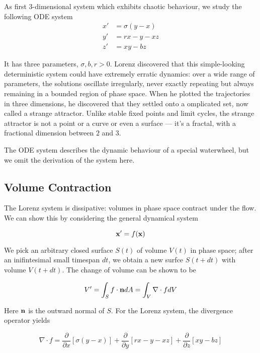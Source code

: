 
As first 3-dimensional system which exhibits chaotic behaviour, we study the following ODE system
\begin{align*}
    x' &= \sigma(y-x) \\
    y' &= rx - y - xz \\
    z' &= xy - bz
\end{align*}

It has three parameters, $\sigma, b, r > 0$. Lorenz discovered that this simple-looking deterministic system could have extremely erratic dynamics: over a wide range of parameters, the solutions oscillate irregularly, never exactly repeating but always remaining in a bounded region of phase space. When he plotted the trajectories in three dimensions, he discovered that they settled onto a  omplicated set, now called a strange attractor. Unlike stable fixed points and limit cycles, the strange attractor is not a point or a  curve or even a surface — it’s a fractal, with a fractional dimension between $2$ and $3$.

The ODE system describes the dynamic behaviour of a special waterwheel, but we omit the derivation of the system here. 

\subsection{Volume Contraction}

The Lorenz system is dissipative: volumes in phase space contract under the flow. We can show this by considering the general dynamical system

\begin{equation*}
    \mathbf{x}' = f(\mathbf{x})
\end{equation*}

We pick an arbitrary closed surface $S(t)$ of volume $V(t)$ in phase space; after an inifintesimal small timespan $dt$, we obtain a new surfce $S(t + dt)$ with volume $V(t+dt)$. The change of volume can be shown to be

\begin{equation*}
    V' = \int_S f \cdot \mathbf{n} dA = \int_V \nabla \cdot f dV
\end{equation*}

Here $\mathbf{n}$ is the outward normal of $S$. For the Lorenz system, the divergence operator yields

\begin{equation*}
    \nabla \cdot f = \frac{\partial}{\partial x} \left[ \sigma(y-x)\right] + \frac{\partial}{\partial y} \left[ rx - y - xz\right] + \frac{\partial}{\partial z} \left[ xy - bz\right]
\end{equation*}

